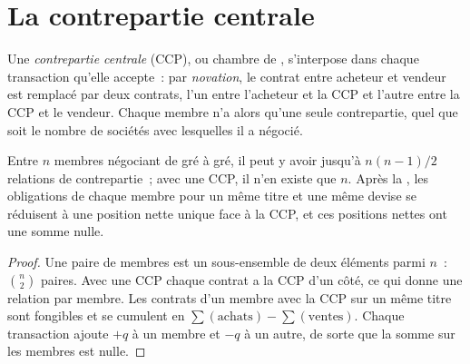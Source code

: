 \section{La contrepartie centrale}

\begin{definition}\label{def:m1:clearing-and-settlement:ccp}
Une \emph{contrepartie centrale} (CCP), ou chambre de
, s'interpose dans chaque transaction qu'elle accepte~: par
\emph{novation}, le contrat entre acheteur et vendeur est
remplacé par deux contrats, l'un entre l'acheteur et la CCP et l'autre entre
la CCP et le vendeur. Chaque membre n'a alors qu'une seule contrepartie, quel que soit
le nombre de sociétés avec lesquelles il a négocié.
\end{definition}

\begin{proposition}\label{prop:m1:clearing-and-settlement:network}
Entre $n$ membres négociant de gré à gré, il peut y avoir jusqu'à $n(n-1)/2$ relations
de contrepartie~; avec une CCP, il n'en existe que $n$. Après la , les obligations de chaque membre
pour un même titre et une même devise se réduisent à une position nette unique face à
la CCP, et ces positions nettes ont une somme nulle.
\end{proposition}
\begin{proof}
Une paire de membres est un sous-ensemble de deux éléments parmi $n$~: $\binom n2$ paires. Avec une CCP
chaque contrat a la CCP d'un côté, ce qui donne une relation par membre.
Les contrats d'un membre avec la CCP sur un même titre sont fongibles et se cumulent en
$\sum(\text{achats}) - \sum(\text{ventes})$. Chaque transaction ajoute $+q$ à un
membre et $-q$ à un autre, de sorte que la somme sur les membres est nulle.
\end{proof}

